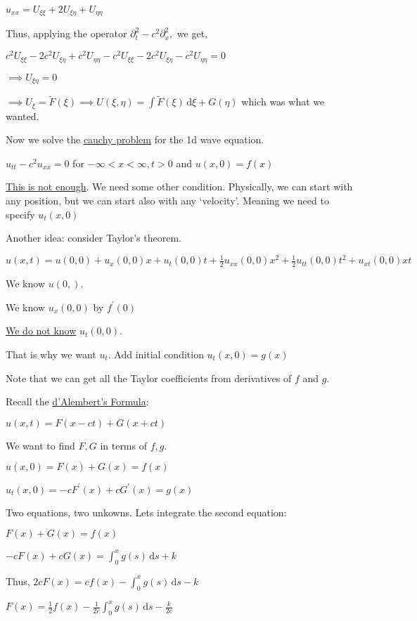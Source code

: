 \documentclass{article}
\theoremstyle{definition}
\begin{document}
\(u_{x x} = U_{\xi\xi}+2U_{\xi\eta}+U_{\eta\eta}\)

Thus, applying the operator \(\partial_t^2 - c^2 \partial _x^2,\) we get,

\(c^2 U_{\xi\xi} - 2c^2 U_{\xi\eta}+c^2 U_{\eta\eta} -c^2 U_{\xi\xi} - 2c^2 U_{\xi\eta}-c^2 U_{\eta\eta} = 0 \) 

\(\implies U_{\xi\eta} = 0\) 

\(\implies U_\xi = \tilde F(\xi) \implies U(\xi,\eta) = \int \tilde F(\xi) \,\mathrm{d} \xi + G(\eta)\) which was what we wanted.

Now we solve the \underline{cauchy problem} for the 1d wave equation.

\(u_{t t} - c^2 u_{x x} = 0\) for \(-\infty < x < \infty , t > 0\) and \(u(x,0) = f(x)\) 

\underline{This is not enough}. We need some other condition. Physically, we can start with any position, but we can start also with any `velocity'. Meaning we need to specify \(u_t (x,0)\) 

Another idea: consider Taylor's theorem.

\(u(x,t) = u(0,0) + u_x (0,0)x + u_t(0,0)t + \frac{1}{2}u_{x x}(0,0)x^2 + \frac{1}{2}u_{t t}(0,0)t^2 + u_{x t}(0,0)xt\) 

We know \(u(0,)\).

We know \(u_x(0,0)\) by \(f^{\prime} (0)\) 

\underline{We do not know} \(u_t(0,0)\).

That is why we want \(u_t\). Add initial condition \(\boxed{u_t(x,0)=g(x)}\) 

Note that we can get all the Taylor coefficients from derivatives of \(f\) and \(g\).

Recall the \underline{d'Alembert's Formula}:

\(u(x,t) = F(x - ct) + G(x + ct)\)

We want to find \(F,G\) in terms of \(f,g\).

\(u(x,0) = F(x) + G(x) = f(x)\) 

\(u_t(x,0) = -c F^{\prime} (x) + c G^{\prime} (x)=g(x)\) 

Two equations, two unkowns. Lets integrate the second equation:

\(F(x)+G(x) = f(x)\) 

\(-c F(x) + cG(x) = \int_0^x g(s)\,\mathrm{d} s + k \) 

Thus, \(2c F(x) = cf(x) - \int_0^x g(s)\,\mathrm{d} s - k\)

\(F(x) = \frac{1}{2}f(x)-\frac{1}{2c}\int_0^x g(s)\,\mathrm{d} s - \frac{k}{2c}\) 
\end{document}
